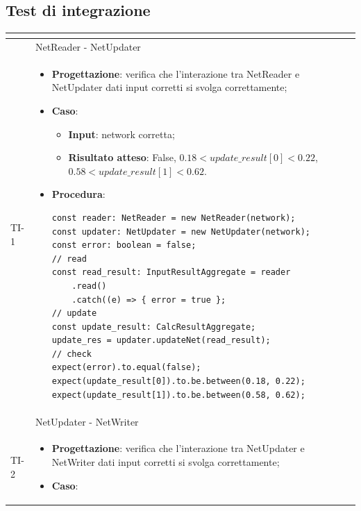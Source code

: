 \renewcommand{\arraystretch}{1}
\newpage

\subsection{Test di integrazione}
\normalsize
\renewcommand{\arraystretch}{1}
\begin{longtable}{|C{2.5cm}|C{13cm}|}
	\hline
	\textbf{\color{title_text}{Test}} & \textbf{\color{title_text}{Specifica}}  \\
	\endhead
	\hline
	 & NetReader - NetUpdater\\
	\hline
	{TI-1} &
	\begin{itemize}
		\item \textbf{Progettazione}: verifica che l'interazione tra NetReader e NetUpdater dati input corretti si svolga correttamente;
		\item \textbf{Caso}: 
		\begin{itemize}
			\item \textbf{Input}: network corretta;
			\item \textbf{Risultato atteso}: False, \newline $0.18 < update\_result[0] < 0.22$, \newline $0.58 < update\_result[1] < 0.62$.
		\end{itemize}
		\item \textbf{Procedura}:
		\begin{lstlisting}
const reader: NetReader = new NetReader(network);
const updater: NetUpdater = new NetUpdater(network);
const error: boolean = false;
// read
const read_result: InputResultAggregate = reader
	.read()
	.catch((e) => { error = true };
// update
const update_result: CalcResultAggregate;
update_res = updater.updateNet(read_result);
// check
expect(error).to.equal(false); 
expect(update_result[0]).to.be.between(0.18, 0.22);
expect(update_result[1]).to.be.between(0.58, 0.62);
		\end{lstlisting}
	\end{itemize} \\ 
	\hline \newpage	\hline
	 &  NetUpdater - NetWriter\\
	\hline	
	{TI-2} &
	\begin{itemize}
		\item \textbf{Progettazione}: verifica che l'interazione tra NetUpdater e NetWriter dati input corretti si svolga correttamente;
		\item \textbf{Caso}: 

\end{itemize}
\end{longtable}
